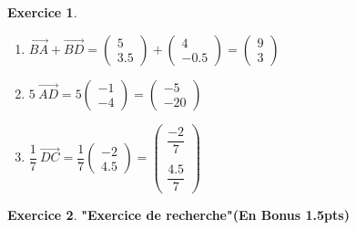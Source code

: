 \documentclass[a4paper,10.9pt]{article}
\theoremstyle{definition}
\newtheorem{exo}{Exercice}
\newcommand{\V}{\overrightarrow}
\begin{document}
\begin{exo}
\begin{enumerate}
\begin{multicols}{2}
\begin{enumerate}[$\diamond$]
		\item $ \V{BA}+\V{BD} = \begin{pmatrix} 5\\3.5\end{pmatrix} + \begin{pmatrix}4\\-0.5\end{pmatrix} = \begin{pmatrix} 9\\3\end{pmatrix}$\\
		\item $5 ~\V{AD} = 5 \begin{pmatrix}-1\\-4\end{pmatrix} = \begin{pmatrix}-5\\-20\end{pmatrix}$ \\
		\item $\dfrac{1}{7}~ \V{DC} = \dfrac{1}{7}\begin{pmatrix}-2\\4.5\end{pmatrix} = \begin{pmatrix}\dfrac{-2}{7}\\ \\ \dfrac{4.5}{7}\end{pmatrix}$ \\
		
	\end{enumerate} 
\end{multicols}



\end{enumerate}
\end{exo}

\chead{}\renewcommand{\headrulewidth}{0.4pt}\renewcommand{\footrulewidth}{0.4pt}

\begin{exo}\textbf{"Exercice de recherche"}\hfill\textbf{(En Bonus 1.5pts)}\\\hfil\\
\end{exo}
\end{document}
